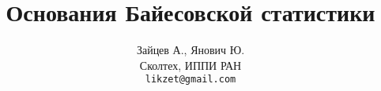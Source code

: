 \documentclass{article}
\begin{document}
\title{Основания Байесовской статистики}
\author{Зайцев А., Янович Ю. \\ Сколтех, ИППИ РАН \\ \texttt{likzet@gmail.com}}
\date{}

\maketitle
\tableofcontents










\appendix


\printindex


 
\end{document}
